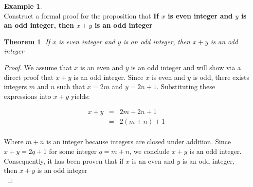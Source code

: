 \documentclass{book}
\newtheorem{theorem}{Theorem}[section]
\theoremstyle{definition}
\newtheorem{example}{Example}[definition]
\theoremstyle{remark}
\begin{document}
\begin{example}
\cite[Chap.1, P.C.1.9, Q.2]{ted} \\

Construct a formal proof for the proposition that {\bf If $x$ is even integer and $y$ is an odd integer, then $x + y$ is an odd integer}

\begin{tcolorbox}
    \begin{theorem}
        If $x$ is even integer and $y$ is an odd integer, then $x + y$ is an odd integer
    \end{theorem}
\end{tcolorbox}

\begin{proof}
    We assume that $x$ is an even and $y$ is an odd integer and will show via a direct proof that $x + y$ is an odd integer. Since $x$ is even and $y$ is odd, there exists integers $m$ and $n$ such that $x = 2m$ and $y = 2n + 1$. Substituting these expressions into $x + y$ yields:
    
    \begin{eqnarray*}
        x + y & = & 2m + 2n + 1 \nonumber \\
        & = & 2(m + n) + 1 \nonumber \\
    \end{eqnarray*}
    
    Where $m + n$ is an integer because integers are closed under addition. Since $x + y = 2q + 1$ for some integer $q = m + n$, we conclude $x + y$ is an odd integer. Consequently, it has been proven that if $x$ is an even and $y$ is an odd integer, then $x + y$ is an odd integer \\
\end{proof}
\end{example}
\end{document}

